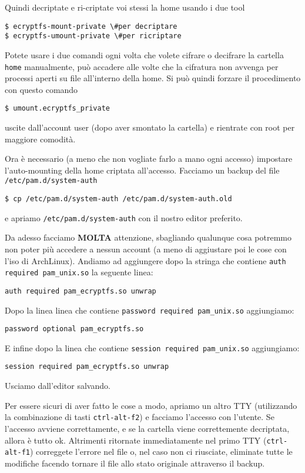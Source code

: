 \documentclass[twoside,italian]{book}
\newcommand{\code}[1]{\texttt{#1}}
\newcommand{\arch}{ArchLinux}
\begin{document}
    Quindi  decriptate e ri-criptate voi stessi la home usando i due tool 
    \begin{lstlisting}
$ ecryptfs-mount-private \#per decriptare
$ ecryptfs-umount-private \#per ricriptare
    \end{lstlisting}

    Potete usare i due comandi ogni volta che volete cifrare o decifrare la cartella \code{home} manualmente, può accadere alle volte che la cifratura non avvenga per processi aperti su file all'interno della home. Si può quindi forzare il procedimento con questo comando 
    \begin{lstlisting}
$ umount.ecryptfs_private
    \end{lstlisting}
    uscite dall'account user (dopo aver smontato la cartella) e rientrate con root per maggiore comodità.
    
    Ora è necessario (a meno che non vogliate farlo a mano ogni accesso) impostare l'auto-mounting della home criptata all'accesso.
    Facciamo un backup del file \code{/etc/pam.d/system-auth} 
    \begin{lstlisting}
$ cp /etc/pam.d/system-auth /etc/pam.d/system-auth.old
    \end{lstlisting}
    e apriamo \code{/etc/pam.d/system-auth} con il nostro editor preferito.
    
    Da adesso facciamo \textbf{MOLTA} attenzione, sbagliando qualunque cosa potremmo non poter più accedere a nessun account (a meno di aggiustare poi le cose con l'iso di \arch). Andiamo ad aggiungere dopo la stringa che contiene \code{auth required pam\_unix.so} la seguente linea:
    \begin{lstlisting}
auth required pam_ecryptfs.so unwrap
    \end{lstlisting}

    Dopo la linea linea che contiene \code{password required pam\_unix.so} aggiungiamo: 
    \begin{lstlisting}
password optional pam_ecryptfs.so
    \end{lstlisting}

    E infine dopo la linea che contiene \code{session required pam\_unix.so} aggiungiamo:
    \begin{lstlisting}
session required pam_ecryptfs.so unwrap
    \end{lstlisting}
    Usciamo dall'editor salvando. 
    
    Per essere sicuri di aver fatto le cose a modo, apriamo un altro \ac{TTY} (utilizzando la combinazione di tasti \code{ctrl-alt-f2}) e facciamo l'accesso con l'utente. Se l'accesso avviene correttamente, e se la cartella viene correttemente decriptata, allora è tutto ok. Altrimenti ritornate immediatamente nel primo \ac{TTY} (\code{ctrl-alt-f1})  correggete l'errore nel file o, nel caso non ci riusciate, eliminate tutte le modifiche facendo tornare il file allo stato originale attraverso il backup.
    
\end{document}
